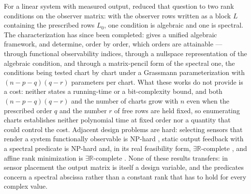 \documentclass[journal]{IEEEtran}
\theoremstyle{plainn}
\theoremstyle{remark}
\begin{document}
For a linear system with measured output, \cite{fer10} reduced that question to two rank conditions on
the observer matrix: with the observer rows written as a block $L$ containing the prescribed rows
$L_0$, one condition is algebraic and one is spectral. The characterization has since been completed:
\cite{dar25} gives a unified algebraic framework, and \cite{fer26a,fer26b} determine, order by order,
which orders are attainable --- through functional observability indices, through a nullspace
representation of the algebraic condition, and through a matrix-pencil form of the spectral one, the
conditions being tested chart by chart under a Grassmann parameterization with $(n-p-q)(q-r)$
parameters per chart. What these works do not provide is a cost: neither states a
running-time or a bit-complexity bound, and both $(n-p-q)(q-r)$ and the number of charts grow with $n$
even when the prescribed order $q$ and the number $r$ of free rows are held fixed, so enumerating
charts establishes neither polynomial time at fixed order nor a quantity that could control the cost.
Adjacent design problems are hard: selecting sensors that render a system functionally observable is
NP-hard \cite{zha25,dey21}, static output feedback with a spectral predicate is NP-hard
\cite{lof26,bar26} and, in its real feasibility form, $\exists\mathbb R$-complete \cite{liu26}, and
affine rank minimization is $\exists\mathbb R$-complete \cite{maj26}. None of these results
transfers: in sensor placement the output matrix is itself a design variable, and the predicates
concern a spectral abscissa rather than a constant rank that has to hold for every complex value.
\end{document}
